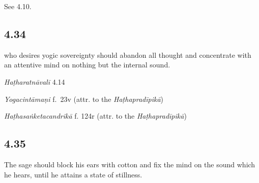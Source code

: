 \begin{ekdosis}
\begin{philcomm}[hp04_033_1]
See 4.10.
\end{philcomm}

\subsection*{4.34}
\begin{translation} who desires yogic sovereignty should abandon all thought and concentrate with an attentive mind on nothing but the internal sound.
\end{translation}


\begin{testimonia}[hp04_034]
\emph{Haṭharatnāvalī} 4.14
\begin{versinnote}
\end{versinnote}

\emph{Yogacintāmaṇi} f.~23v (attr. to the \emph{Haṭhapradīpikā})
\begin{versinnote}
\tl{\var{°sāmrājyam icchatā ] U, °sāmrājyadhiṣṭhitaḥ N}\\!}
\end{versinnote}

\emph{Haṭhasaṅketacandrikā} f. 124r (attr. to the \emph{Haṭhapradīpikā})
\begin{versinnote}
\end{versinnote}
\end{testimonia}


\subsection*{4.35}
\begin{translation}[hp04_035]
The sage should block his ears with cotton and fix the mind on the sound which he hears, until he attains a state of stillness.
\end{translation}


\end{ekdosis}
